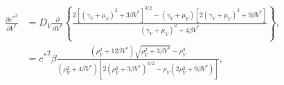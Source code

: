 \documentclass{article}
\begin{document}
\begin{equation}
  \begin{split}
    \frac{\partial {c^*}^2}{\partial V^*}
    &=
    D_V
    \frac{\partial}{\partial V^*} \left\{
      \frac{2 \left[(\gamma_V + \mu_V)^2 + 3 \beta V^*\right]^{3/2}
        - (\gamma_V + \mu_V) \left[2 (\gamma_V + \mu_V)^2 + 9 \beta V^*\right]}
      {(\gamma_V + \mu_V)^2 + 4 \beta V^*}
    \right\},
    \\
    &=
    {c^*}^2 \beta
    \frac{\left(\rho_V^2 + 12 \beta V^*\right)
      \sqrt{\rho_V^2 + 3 \beta V^*} - \rho_V^3}
    {\left(\rho_V^2 + 4 \beta V^*\right)
      \left[2 \left(\rho_V^2 + 3 \beta V^*\right)^{3/2}
        - \rho_V \left(2 \rho_V^2 + 9 \beta V^*\right)\right]},
  \end{split}
\end{equation}
\end{document}
